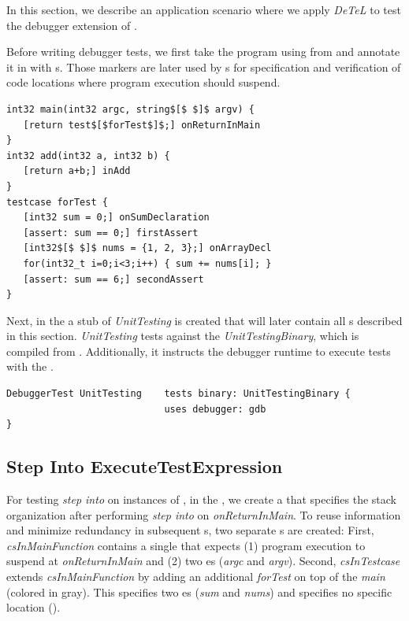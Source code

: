 In this section, we describe an application scenario where we apply \emph{DeTeL}  
to test the debugger extension of . 

Before writing debugger tests, we first take the program using 
from  and annotate it in 
with s. Those markers are later used by s 
for specification and verification of code locations where program
execution should suspend.

\begin{lstlisting}[language=markerDSL,caption=Annotated
program,label=lst:annotatedProg] 
int32 main(int32 argc, string$[$ $]$ argv) {
   [return test$[$forTest$]$;] onReturnInMain
}
int32 add(int32 a, int32 b) {
   [return a+b;] inAdd
}
testcase forTest {
   [int32 sum = 0;] onSumDeclaration
   [assert: sum == 0;] firstAssert
   [int32$[$ $]$ nums = {1, 2, 3};] onArrayDecl
   for(int32_t i=0;i<3;i++) { sum += nums[i]; }
   [assert: sum == 6;] secondAssert
}
\end{lstlisting}	

Next, in the  a stub of 
\emph{UnitTesting} is created that will later contain all s described in this
section. \emph{UnitTesting} tests against the 
\emph{UnitTestingBinary}, which is compiled from .
Additionally, it instructs the debugger runtime to execute tests with the
.

\begin{lstlisting}[language=testingDSL,caption=\ic{DebuggerTest} stub,
label=lst:DebuggerTestingStub]
DebuggerTest UnitTesting    tests binary: UnitTestingBinary {
                            uses debugger: gdb
}  
\end{lstlisting}

\subsection{Step Into ExecuteTestExpression}

For testing \emph{step into} on instances of ,
in the , we create a  that specifies
the stack organization after performing \emph{step
into} on \emph{onReturnInMain}. To reuse information and 
minimize redundancy in subsequent
s, two separate 
s are created: First, \emph{csInMainFunction} 
contains a single  that expects (1) program execution to suspend
at \emph{onReturnInMain} and (2) two es (\emph{argc} and
\emph{argv}). Second, \emph{csInTestcase} extends \emph{csInMainFunction} by adding an
additional  \emph{forTest} on top of the 
\emph{main} (colored in gray). This  specifies two es
(\emph{sum} and \emph{nums}) and specifies no specific location
().

